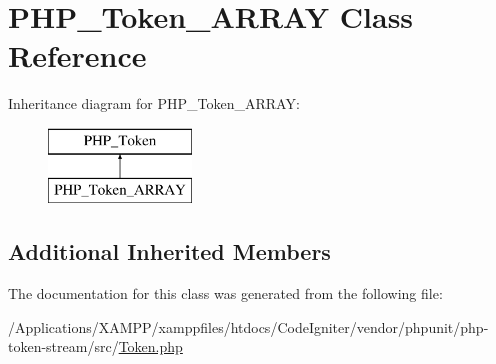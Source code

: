\hypertarget{class_p_h_p___token___a_r_r_a_y}{}\section{P\+H\+P\+\_\+\+Token\+\_\+\+A\+R\+R\+AY Class Reference}
\label{class_p_h_p___token___a_r_r_a_y}
Inheritance diagram for P\+H\+P\+\_\+\+Token\+\_\+\+A\+R\+R\+AY\+:\begin{figure}[H]
\begin{center}
\leavevmode
\includegraphics[height=2.000000cm]{class_p_h_p___token___a_r_r_a_y}
\end{center}
\end{figure}
\subsection*{Additional Inherited Members}


The documentation for this class was generated from the following file\+:\begin{DoxyCompactItemize}
\item 
/\+Applications/\+X\+A\+M\+P\+P/xamppfiles/htdocs/\+Code\+Igniter/vendor/phpunit/php-\/token-\/stream/src/\mbox{\hyperlink{_token_8php}{Token.\+php}}\end{DoxyCompactItemize}
